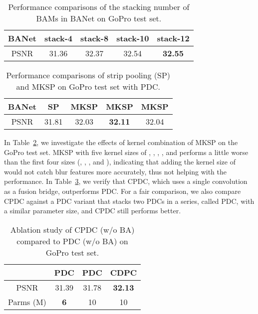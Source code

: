 \begin{table}[t]
\centering
\setlength{\tabcolsep}{4mm}
\caption{Performance comparisons of the stacking number of BAMs in BANet on GoPro test set.}
\begin{tabular}{c|cccc}\hline
BANet & stack-4 & stack-8  & stack-10 & stack-12 \\\hline
PSNR & 31.36 & 32.37  & 32.54 &  \bf32.55 \\\hline 
\end{tabular}
\label{tab:BAM_ablation2}
\end{table}

\begin{table}[t]
\centering
\setlength{\tabcolsep}{3mm}
\caption{Performance comparisons of strip pooling (SP) and MKSP on GoPro test set with PDC.}
\begin{tabular}{c|cccc}\hline
BANet & SP & MKSP & MKSP & MKSP \\\hline
PSNR & 31.81 & 32.03  & \bf32.11 &  32.04 \\\hline 
\end{tabular}
\label{tab:MKSP_ablation}
\end{table}

In Table~\ref{tab:MKSP_ablation}, we investigate the effects of kernel combination of MKSP on the GoPro test set. 
MKSP with five kernel sizes of , , , , and  performs a little worse than
the first four sizes (, , , and ), indicating that adding the kernel size of  would not catch blur features more accurately, thus not helping with
the performance.
In Table~\ref{tab:compared CPDC with pdc}, we verify that CPDC, which uses a single convolution as a fusion bridge, outperforms PDC. 
For a fair comparison, we also compare CPDC against a PDC variant that stacks two PDCs in a series, called PDC, with a similar parameter size, and CPDC still performs better. 

\begin{table}[t]
\centering
\setlength{\tabcolsep}{6mm}
\caption{Ablation study of CPDC (w/o BA) compared to PDC (w/o BA) on GoPro test set.}
\begin{tabular}{cccc}\hline
 & PDC & PDC & CDPC \\\hline
PSNR & 31.39 & 31.78  & \bf32.13  \\ 
Parms (M) & \bf6 & 10  & 10  \\\hline
\end{tabular}
\label{tab:compared CPDC with pdc}
\end{table}

